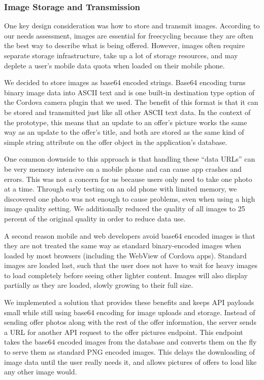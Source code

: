 \subsubsection*{Image Storage and Transmission}

One key design consideration was how to store and transmit images. According to our needs assessment, images are essential for freecycling because they are often the best way to describe what is being offered. However, images often require separate storage infrastructure, take up a lot of storage resources, and may deplete a user's mobile data quota when loaded on their mobile phone.

We decided to store images as base64 encoded strings. Base64 encoding turns binary image data into ASCII text and is one built-in destination type option of the Cordova camera plugin that we used. The benefit of this format is that it can be stored and transmitted just like all other ASCII text data. In the context of the prototype, this means that an update to an offer's picture works the same way as an update to the offer's title, and both are stored as the same kind of simple string attribute on the offer object in the application's database.

One common downside to this approach is that handling these ``data URLs'' can be very memory intensive on a mobile phone and can cause app crashes and errors. This was not a concern for us because users only need to take one photo at a time. Through early testing on an old phone with limited memory, we discovered one photo was not enough to cause problems, even when using a high image quality setting. We additionally reduced the quality of all images to 25 percent of the original quality in order to reduce data use.

A second reason mobile and web developers avoid base64 encoded images is that they are not treated the same way as standard binary-encoded images when loaded by most browsers (including the WebView of Cordova apps). Standard images are loaded last, such that the user does not have to wait for heavy images to load completely before seeing other lighter content. Images will also display partially as they are loaded, slowly growing to their full size.

We implemented a solution that provides these benefits and keeps API payloads small while still using base64 encoding for image uploads and storage. Instead of sending offer photos along with the rest of the offer information, the server sends a URL for another API request to the offer pictures endpoint. This endpoint takes the base64 encoded images from the database and converts them on the fly to serve them as standard PNG encoded images. This delays the downloading of image data until the user really needs it, and allows pictures of offers to load like any other image would.


